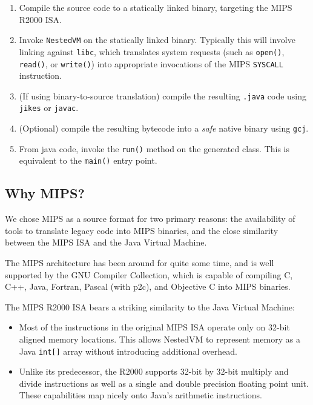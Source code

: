 \documentclass{acmconf}
\begin{document}
\begin{enumerate}

\item Compile the source code to a statically linked binary, targeting
      the MIPS R2000 ISA.

\item Invoke {\tt NestedVM} on the statically linked binary.
      Typically this will involve linking against {\tt libc}, which
      translates system requests (such as {\tt open()}, {\tt read()},
      or {\tt write()}) into appropriate invocations of the MIPS
      {\tt SYSCALL} instruction.

\item (If using binary-to-source translation) compile the resulting
      {\tt .java} code using {\tt jikes} or {\tt javac}.

\item (Optional) compile the resulting bytecode into a {\it safe}
      native binary using {\tt gcj}.

\item From java code, invoke the {\tt run()} method on the generated
      class.  This is equivalent to the {\tt main()} entry point.

\end{enumerate}


\subsection{Why MIPS?}

We chose MIPS as a source format for two primary reasons: the
availability of tools to translate legacy code into MIPS binaries, and
the close similarity between the MIPS ISA and the Java Virtual Machine.

The MIPS architecture has been around for quite some time, and is well
supported by the GNU Compiler Collection, which is capable of
compiling C, C++, Java, Fortran, Pascal (with p2c), and Objective C
into MIPS binaries.

The MIPS R2000 ISA bears a striking similarity to the Java Virtual
Machine:

\begin{itemize}

\item Most of the instructions in the original MIPS ISA operate only on
      32-bit aligned memory locations. This allows NestedVM to represent
      memory as a Java {\tt int[]} array without introducing additional 
      overhead.

\item Unlike its predecessor, the R2000 supports 32-bit by 32-bit
      multiply and divide instructions as well as a single and double
      precision floating point unit.  These capabilities map nicely
      onto Java's arithmetic instructions.

\end{itemize}
\end{document}
